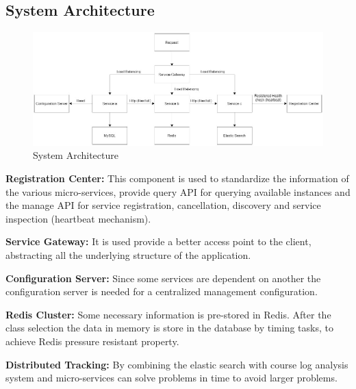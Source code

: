 \documentclass[14pt]{extarticle}
\begin{document}
\subsection{System Architecture}
\begin{figure}[H]
  \centering
    \includegraphics[scale=0.4]{ArqFig1.jpg}
  \caption{System Architecture}
\end{figure}
\noindent
\textbf{Registration Center:} This component is used to standardize the information of the various micro-services, provide query API for querying available instances and the manage API for service registration, cancellation, discovery and service inspection (heartbeat mechanism).

\noindent
\textbf{Service Gateway:} It is used provide a better access point to the client, abstracting all the underlying structure of the application.

\noindent
\textbf{Configuration Server:} Since some services are dependent on another the configuration server is needed for a centralized management configuration.

\noindent
\textbf{Redis Cluster:} Some necessary information is pre-stored in Redis. After the class selection the data in memory is store in the database by timing tasks, to achieve Redis pressure resistant property.

\noindent
\textbf{Distributed Tracking:} By combining the elastic search with course log analysis system and micro-services can solve problems in time to avoid larger problems.
\end{document}

